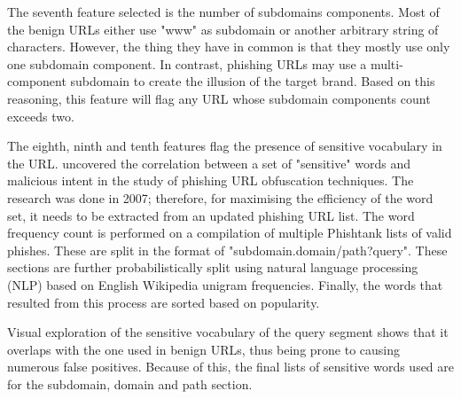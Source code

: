 The seventh feature selected is the number of subdomains components. Most of the benign URLs either use "www" as subdomain or another arbitrary string of characters. However, the thing they have in common is that they mostly use only one subdomain component. In contrast, phishing URLs may use a multi-component subdomain to create the illusion of the target brand. Based on this reasoning, this feature will flag any URL whose subdomain components count exceeds two.

The eighth, ninth and tenth features flag the presence of sensitive vocabulary in the URL. \cite{Sujata_Garera} uncovered the correlation between a set of "sensitive" words and malicious intent in the study of phishing URL obfuscation techniques. The research was done in 2007; therefore, for maximising the efficiency of the word set, it needs to be extracted from an updated phishing URL list.
The word frequency count is performed on a compilation of multiple Phishtank lists of valid phishes. These are split in the format of "subdomain.domain/path?query". These sections are further probabilistically split using natural language processing (NLP) based on English Wikipedia unigram frequencies. Finally, the words that resulted from this process are sorted based on popularity.

Visual exploration of the sensitive vocabulary of the query segment shows that it overlaps with the one used in benign URLs, thus being prone to causing numerous false positives. Because of this, the final lists of sensitive words used are for the subdomain, domain and path section.


